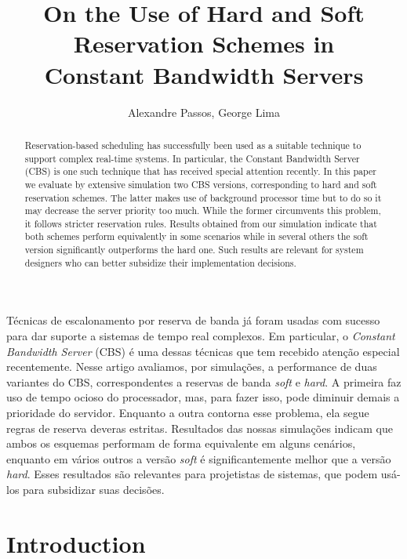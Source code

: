 \documentclass[12pt]{article}
\author{Alexandre Passos, George Lima}
\title{On the Use of Hard and Soft Reservation Schemes in \\ Constant Bandwidth Servers}
\begin{document}
\graphicspath{{figs/}{data/}}

\maketitle

\begin{abstract}

  Reservation-based scheduling has successfully been used as a
  suitable technique to support complex real-time systems. In
  particular, the Constant Bandwidth Server (CBS) is one such
  technique that has received special attention recently. In this
  paper we evaluate by extensive simulation two CBS versions,
  corresponding to hard and soft reservation schemes. The latter makes
  use of background processor time but to do so it may decrease the
  server priority too much. While the former circumvents this problem,
  it follows stricter reservation rules. Results obtained from our
  simulation indicate that both schemes perform equivalently in some
  scenarios while in several others the soft version significantly
  outperforms the hard one. Such results are relevant for system
  designers who can better subsidize their implementation decisions.

\end{abstract}
  
\begin{resumo}
  Técnicas de escalonamento por reserva de banda já foram usadas com
  sucesso para dar suporte a sistemas de tempo real complexos. Em
  particular, o \textit{Constant Bandwidth Server} (CBS) é uma dessas
  técnicas que tem recebido atenção especial recentemente. Nesse
  artigo avaliamos, por simulações, a performance de duas variantes do
  CBS, correspondentes a reservas de banda \textit{soft} e
  \textit{hard}. A primeira faz uso de tempo ocioso do processador,
  mas, para fazer isso, pode diminuir demais a prioridade do
  servidor. Enquanto a outra contorna esse problema, ela segue regras
  de reserva deveras estritas. Resultados das nossas simulações
  indicam que ambos os esquemas performam de forma equivalente em
  alguns cenários, enquanto em vários outros a versão \textit{soft} é
  significantemente melhor que a versão \textit{hard}. Esses
  resultados são relevantes para projetistas de sistemas, que podem
  usá-los para subsidizar suas decisões.
\end{resumo}
\section{Introduction}
\label{sec:introduction}
\end{document}
